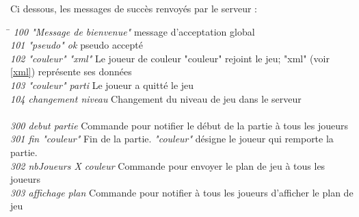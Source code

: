 \par

Ci dessous, les messages de succès renvoyés par le serveur : 

\begin{tabbing}

\hspace{5cm}\=\kill
 \textit{100 "Message de bienvenue"}		\> message d'acceptation global \\
 \textit{101 "pseudo" ok} 					\> pseudo accepté \\
 \textit{102 "couleur" "xml"}		 		\> Le joueur de couleur "couleur" rejoint le jeu; "xml" (voir \ref{xml}) représente ses données \\
 \textit{103 "couleur" parti}				\> Le joueur a quitté le jeu \\
 \textit{104 changement niveau}			\> Changement du niveau de jeu dans le serveur \\\\

 \textit{300 debut partie}					\> Commande pour notifier le début de la partie à tous les joueurs \\
 \textit{301 fin "couleur"}				\> Fin de la partie. \textit{"couleur"} désigne le joueur qui remporte la partie. \\
 \textit{302 nbJoueurs {X couleur}}		\> Commande pour envoyer le plan de jeu à tous les joueurs \\

 \textit{303 affichage plan} 				\> Commande pour notifier à tous les joueurs d'afficher le plan de jeu \\
 
\end{tabbing} 
